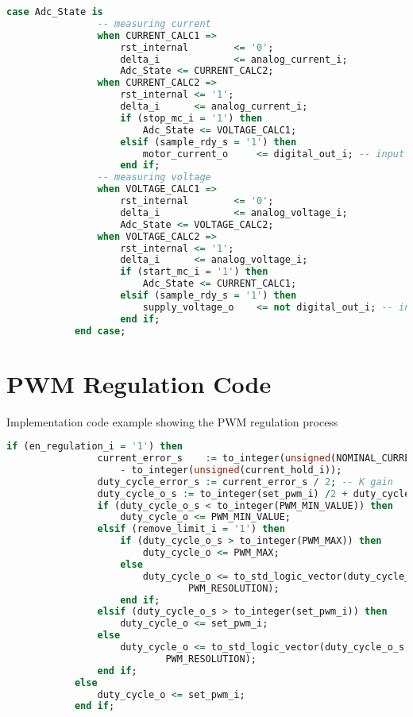 \begin{lstlisting}[language=VHDL]
case Adc_State is
				-- measuring current 
				when CURRENT_CALC1 =>
					rst_internal        <= '0';
					delta_i             <= analog_current_i;
					Adc_State <= CURRENT_CALC2;
				when CURRENT_CALC2 =>
					rst_internal <= '1';
					delta_i      <= analog_current_i;
					if (stop_mc_i = '1') then
						Adc_State <= VOLTAGE_CALC1;
					elsif (sample_rdy_s = '1') then
						motor_current_o     <= digital_out_i; -- input topology 0
					end if;
				-- measuring voltage 
				when VOLTAGE_CALC1 =>
					rst_internal        <= '0';
					delta_i             <= analog_voltage_i;
					Adc_State <= VOLTAGE_CALC2;
				when VOLTAGE_CALC2 =>
					rst_internal <= '1';
					delta_i      <= analog_voltage_i;
					if (start_mc_i = '1') then 
						Adc_State <= CURRENT_CALC1;
					elsif (sample_rdy_s = '1') then 
						supply_voltage_o    <= not digital_out_i; -- input topology
					end if;
			end case;

\end{lstlisting}



\section{PWM Regulation Code}
\label{pwm-regulation-code}
Implementation code example showing the PWM regulation process

\begin{lstlisting}[language=VHDL]
			if (en_regulation_i = '1') then
				current_error_s    := to_integer(unsigned(NOMINAL_CURRENT)) 
				    - to_integer(unsigned(current_hold_i));
				duty_cycle_error_s := current_error_s / 2; -- K gain
				duty_cycle_o_s := to_integer(set_pwm_i) /2 + duty_cycle_error_s; 
				if (duty_cycle_o_s < to_integer(PWM_MIN_VALUE)) then
					duty_cycle_o <= PWM_MIN_VALUE;
				elsif (remove_limit_i = '1') then
					if (duty_cycle_o_s > to_integer(PWM_MAX)) then
						duty_cycle_o <= PWM_MAX;
					else
						duty_cycle_o <= to_std_logic_vector(duty_cycle_o_s, 
						        PWM_RESOLUTION);
					end if;
				elsif (duty_cycle_o_s > to_integer(set_pwm_i)) then
					duty_cycle_o <= set_pwm_i;
				else
					duty_cycle_o <= to_std_logic_vector(duty_cycle_o_s, 
					        PWM_RESOLUTION);
				end if;
			else
				duty_cycle_o <= set_pwm_i;
			end if;
\end{lstlisting}




